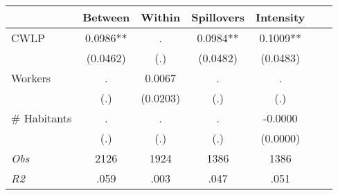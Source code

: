 \begin{tabular}{l*{6}{c}}\hline&\multicolumn{1}{c}{Between}&\multicolumn{1}{c}{Within}&\multicolumn{1}{c}{Spillovers}&\multicolumn{1}{c}{Intensity}\\ \hline 
CWLP & 0.0986** & . & 0.0984** & 0.1009** \\
 & (0.0462) & (.) & (0.0482) & (0.0483) \\
Workers & . & 0.0067 & . & . \\
 & (.) & (0.0203) & (.) & (.) \\
\# Habitants & . & . & . & -0.0000 \\
  & (.) & (.) & (.) & (0.0000) \\
\hline \textit{Obs} & 2126 & 1924 & 1386 & 1386  \\ \textit{R2} & .059 & .003 & .047 & .051 \\ \hline \end{tabular}
